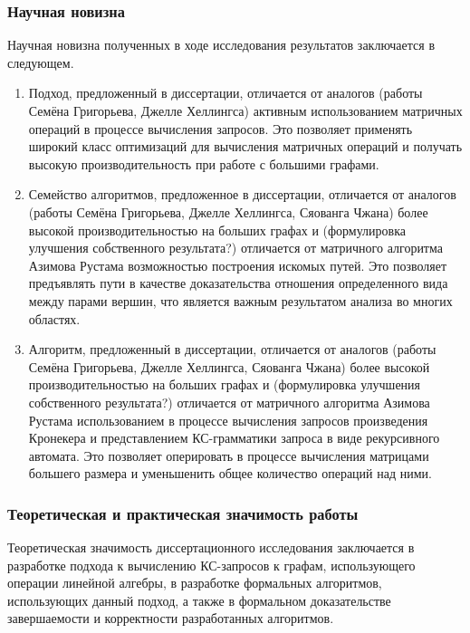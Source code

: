 \subsubsection*{\large{Научная новизна}}

Научная новизна полученных в ходе исследования результатов заключается в следующем.

\begin{enumerate}

\item Подход, предложенный в диссертации, отличается от аналогов (работы Семёна Григорьева, Джелле Хеллингса) активным использованием матричных операций в процессе вычисления запросов. Это позволяет применять широкий класс оптимизаций для вычисления матричных операций и получать высокую производительность при работе с большими графами.

\item Семейство алгоритмов, предложенное в диссертации, отличается от аналогов (работы Семёна Григорьева, Джелле Хеллингса, Сяованга Чжана) более высокой производительностью на больших графах и (формулировка улучшения собственного результата?) отличается от матричного алгоритма Азимова Рустама возможностью построения искомых путей. Это позволяет предъявлять пути в качестве доказательства отношения определенного вида между парами вершин, что является важным результатом анализа во многих областях.

\item Алгоритм, предложенный в диссертации, отличается от аналогов (работы Семёна Григорьева, Джелле Хеллингса, Сяованга Чжана) более высокой производительностью на больших графах и (формулировка улучшения собственного результата?) отличается от матричного алгоритма Азимова Рустама использованием в процессе вычисления запросов произведения Кронекера и представлением КС-грамматики запроса в виде рекурсивного автомата. Это позволяет оперировать в процессе вычисления матрицами большего размера и уменьшенить общее количество операций над ними.

\end{enumerate}

\subsubsection*{\large{Теоретическая и практическая значимость работы}}
Теоретическая значимость диссертационного исследования заключается в разработке подхода к вычислению КС-запросов к графам, использующего операции линейной алгебры, в разработке формальных алгоритмов, использующих данный подход, а также в формальном доказательстве завершаемости и корректности разработанных алгоритмов.

